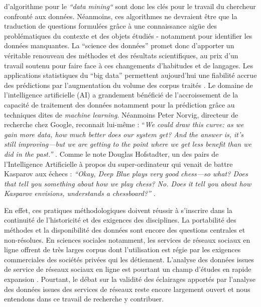 d{\textquoteright}algorithme pour le \textit{{\textquotedblleft}data mining{\textquotedblleft}} sont donc les clés pour le travail du chercheur confronté aux données. Néanmoins, ces algorithmes ne devraient \^etre que la traduction de questions formulées gr\^ace à une connaissance aig\"ue des problématiques du contexte et des objets étudiés - notamment pour identifier les données manquantes. La {\textquotedblleft}science des données{\textquotedblright} promet donc d{\textquoteright}apporter un véritable renouveau des méthodes et des résultats scientifiques, au prix d{\textquoteright}un travail soutenu pour faire face à ces changements d{\textquoteright}habitudes et de langages. Les applications statistiques du {\textquotedblleft}big data{\textquotedblright} permettent aujourd{\textquoteright}hui une fiabilité accrue des prédictions par l{\textquoteright}augmentation du volume des corpus traités \citep{Breiman2001}. Le domaine de l{\textquoteright}intelligence artificielle (AI) a grandement bénéficié de l{\textquoteright}accroissement de la capacité de traitement des données notamment pour la prédiction gr\^ace au techniques dites de \textit{machine learning}. Néanmoins Peter Norvig, directeur de recherche chez Google, reconnait lui-m\^eme : {\textquotedblleft}\textit{We could draw this curve: as we gain more data, how much better does our system get? And the answer is, it{\textquoteright}s still improving---but we are getting to the point where we get less benefit than we did in the past.{\textquotedblright} }\citep{Somers2013}. Comme le note Douglas Hofstadter, un des pairs de l{\textquoteright}Intelligence Artificielle à propos du super-ordinateur qui venait de battre Kasparov aux échecs : \textit{{\textquotedblleft}Okay, Deep Blue plays very good chess---so what? Does that tell you something about how we play chess? No. Does it tell you about how Kasparov envisions, understands a chessboard?{\textquotedblright} }\citep{Somers2013}.  

En effet, ces pratiques méthodologiques doivent réussir à s{\textquoteright}inscrire dans la continuité de l{\textquoteright}historicité et des exigences des disciplines. La portabilité des méthodes et la disponibilité des données sont encore des questions centrales et non-résolues. En sciences sociales notamment, les services de réseaux sociaux en ligne offrent de très larges corpus dont l{\textquoteright}utilisation est régie par les exigences commerciales des sociétés privées qui les détiennent. L{\textquoteright}analyse des données issues de service de réseaux sociaux en ligne est pourtant un champ d{\textquoteright}études en rapide expansion \citep{Nettleton2013}. Pourtant, le débat sur la validité des éclairages apportés par l{\textquoteright}analyse des données issues des services de réseaux reste encore largement ouvert et nous entendons dans ce travail de recherche y contribuer.  

